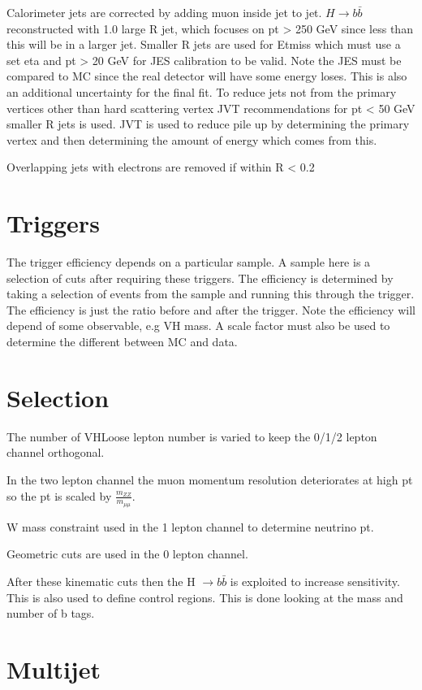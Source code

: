 Calorimeter jets are corrected by adding muon inside jet to jet. $H \rightarrow b \bar{b}$ reconstructed with 1.0 large R jet, which focuses on pt > 250 GeV since less than this will be in a larger jet. Smaller R jets are used for Etmiss which must use a set eta and pt > 20 GeV for JES calibration to be valid. Note the JES must be compared to MC since the real detector will have some energy loses. This is also an additional uncertainty for the final fit.  To reduce jets not from the primary vertices other than hard scattering vertex JVT recommendations for pt < 50 GeV smaller R jets is used.  JVT is used to reduce pile up by determining the primary vertex and then determining the amount of energy which comes from this. 

Overlapping jets with electrons are removed if within R < 0.2 

\section{Triggers}
The trigger efficiency depends on a particular sample. A sample here is a selection of cuts after requiring these triggers.  The efficiency is determined by taking a selection of events from the sample and running this through the trigger. The efficiency is just the ratio before and after the trigger. Note the efficiency will depend of some observable, e.g VH mass. A scale factor must also be used to determine the different between MC and data. 

\section{Selection}

The number of VHLoose lepton number is varied to keep the 0/1/2 lepton channel orthogonal. 

In the two lepton channel the muon momentum resolution deteriorates at high pt so the pt is scaled by $\frac{m_{ZZ}}{m_{\mu \mu}}$.

W mass constraint used in the 1 lepton channel to determine neutrino pt. 

Geometric cuts are used in the 0 lepton channel. 

After these kinematic cuts then the H $\rightarrow b\bar{b}$ is exploited to increase sensitivity. This is also used to define control regions. This is done looking at the mass and number of b tags.  

\section{Multijet}


